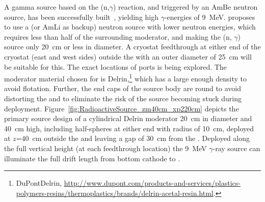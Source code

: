 A gamma source based on the (n,$\gamma$) reaction, and triggered by an AmBe neutron source, has been successfully built~\cite{Rogers:1996ks}, yielding high $\gamma$-energies of \SI{9}{\MeV}.  %
proposes to use a  (or AmLi as backup) neutron source with lower neutron energies, which requires less than half of the surrounding moderator, and making the  (n, $\gamma$) source only \SI{20}{\cm} or less in diameter. A cryostat feedthrough at either end of the cryostat (east and west sides) outside the  with an outer diameter of \SI{25}{\cm} will be suitable for this. The exact locations of ports is being explored.
 The moderator material chosen for  is Delrin,\footnote{DuPont\texttrademark Delrin\textregistered, \url{http://www.dupont.com/products-and-services/plastics-polymers-resins/thermoplastics/brands/delrin-acetal-resin.html}.} which has a large enough density to avoid flotation. Further, the end caps of the source
body are round to avoid distorting the \efield and to
eliminate the risk of the source becoming stuck during deployment. 
Figure~\ref{fig:RadioactiveSource_zm40cm_xp220cm} depicts the primary source design of a cylindrical Delrin moderator \SI{20}{\cm} in diameter and \SI{40}{\cm} high, including half-spheres at either end with
radius of \SI{10}{\cm}, deployed at $z$=\SI{40}{\cm} outside the  and leaving a gap of \SI{30}{\cm} from the . Deployed along the full vertical height (at each feedthrough location) the 9~MeV $\gamma$-ray source can illuminate the full drift length from bottom cathode to .

